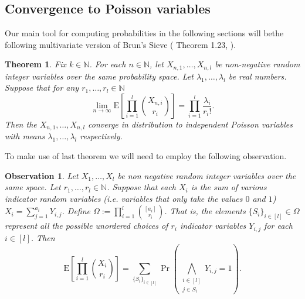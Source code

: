 \documentclass[12pt,notitlepage,a4paper]{article}
\newtheorem{theorem}{Theorem}[section]
\newtheorem{obs}{Observation}[section]
\theoremstyle{definition}
\newcommand{\N}{\mathbb{N}}
\newcommand{\Ln}{\lim\limits_{n\to \infty}}
\begin{document}
%	


\subsection{Convergence to Poisson variables}

Our main tool for computing probabilities in the following sections
will bethe following multivariate version of Brun's Sieve (
Theorem 1.23, \cite{bollobas2001random}).


\begin{theorem} \label{thm:BrunSieve}
	Fix $k\in \N$. For each 
	$n\in \N$, let $X_{n,1},\dots, X_{n,l}$ be non-negative
	random integer variables over the same
	probability space. Let $\lambda_1,\dots,\lambda_l$ 
	be real numbers. Suppose that for any $r_1,\dots,r_l \in \N$
	\[ 
	\Ln \mathrm{E}\left[
	\prod_{i=1}^{l} \binom{X_{n,i}}{r_i} \right]
	= \prod_{i=1}^{l} \frac{\lambda_i}{r_i !}.	
	\]
	Then the $X_{n,1},\dots,X_{n,l}$ converge in distribution to
	independent Poisson variables with means $\lambda_1,\dots,\lambda_l$ 
	respectively. 
\end{theorem}

To make use of last theorem we will need to employ the following observation.

\begin{obs} \label{obs:binomialmean} Let $X_1,\dots, X_l$ be non negative
	random integer variables over the same space. 
	Let $r_1,\dots,r_l\in \N$.	Suppose that
	each $X_i$ is the sum of various indicator random variables
	(i.e. variables that only take the values $0$ and $1$)
	$X_i=\sum_{j=1}^{a_i} Y_{i,j}$. Define 
	$\Omega:=\prod_{i=1}^l \binom{[a_i]}{r_i}$. That is,
	the elements $\{S_i\}_{i\in[l]}\in \Omega$
	represent all the possible unordered choices of 
	$r_i$ indicator variables $Y_{i,j}$ for each $i\in [l]$.
	Then 
	\[
	\mathrm{E}\left[
	\prod_{i=1}^{l} \binom{X_i}{r_i}\right]=
	\sum_{\{S_i\}_{i\in [l]}} \Pr\left(
	\bigwedge_{\substack{i\in [l]\\ j\in S_i}} Y_{i,j}=1
	\right).	
	\]
\end{obs} 
\end{document}
